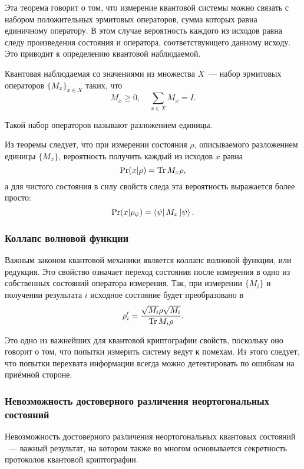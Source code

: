 Эта теорема говорит о том, что измерение квантовой системы можно связать с набором положительных эрмитовых операторов, сумма которых равна единичному оператору. В этом случае вероятность каждого из исходов равна следу произведения состояния и оператора, соответствующего данному исходу. Это приводит к определению квантовой наблюдаемой.
\begin{definition}
  Квантовая наблюдаемая со значениями из множества $X$~--- набор эрмитовых операторов $\{M_x\}_{x \in X}$ таких, что
  \begin{equation} M_x \ge 0,\quad \sum_{x \in X} M_x = I. \end{equation}
\end{definition}

Такой набор операторов называют разложением единицы.

Из теоремы следует, что при измерении состояния $\rho$, описываемого разложением единицы $\{M_x\}$, вероятность получить каждый из исходов $x$ равна
\begin{equation} \operatorname{Pr}(x|\rho) = \operatorname{Tr} M_x \rho, \end{equation}
а для чистого состояния \state{\psi} в силу свойств следа эта вероятность выражается более просто:
\begin{equation} \operatorname{Pr}(x|\rho_\psi) = \left\langle \psi \right| M_x \left| \psi \right\rangle. \end{equation}

\subsubsection{Коллапс волновой функции}
Важным законом квантовой механики является коллапс волновой функции, или редукция. Это свойство означает переход состояния после измерения в одно из собственных состояний оператора измерения. Так, при измерении $\{M_i\}$ и получении результата $i$ исходное состояние будет преобразовано в 
\begin{equation} \rho'_i = \frac{\sqrt{M_i} \rho \sqrt{M_i}}{\operatorname{Tr} M_i \rho}. \end{equation}

Это одно из важнейших для квантовой криптографии свойств, поскольку оно говорит о том, что попытки измерить систему ведут к помехам. Из этого следует, что попытки перехвата информации всегда можно детектировать по ошибкам на приёмной стороне.

\subsubsection{Невозможность достоверного различения неортогональных состояний}\label{no_discrimination_theorem}
Невозможность достоверного различения неортогональных квантовых состояний \cite{non_orthogonal_states_discrimination_theorem}~--- важный результат, на котором также во многом основывается секретность протоколов квантовой криптографии.

